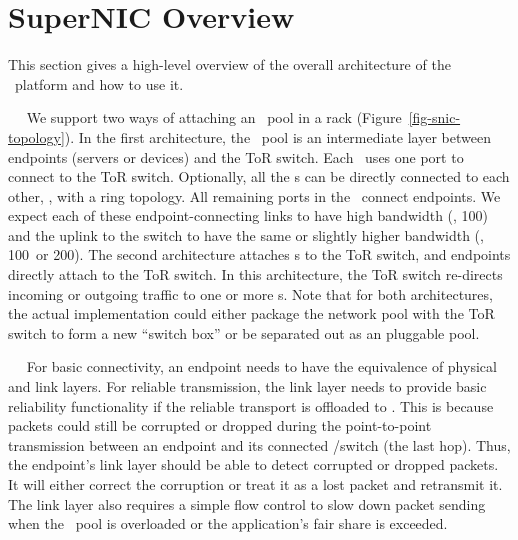 \section{SuperNIC Overview}
\label{sec:snic:overview}

This section gives a high-level overview of the overall architecture of the \snic\ platform and how to use it.

~~
We support two ways of attaching an \snic\ pool in a rack (Figure~\ref{fig-snic-topology}).
In the first architecture, the \snic\ pool is an intermediate layer between endpoints (servers or devices) and the ToR switch.
Each \snic\ uses one port to connect to the ToR switch.
Optionally, all the \snic{}s can be directly connected to each other, \eg, with a ring topology.
All remaining ports in the \snic\ connect endpoints.
We expect each of these endpoint-connecting links to have high bandwidth (\eg, 100\Gbps) and the uplink to the switch to have the same or slightly higher bandwidth (\eg, 100\Gbps\ or 200\Gbps). 
%
The second architecture attaches \snic{}s to the ToR switch, and endpoints directly attach to the ToR switch.
In this architecture, the ToR switch re-directs incoming or outgoing traffic to one or more \snic{}s. 
Note that for both architectures, the actual implementation could either package the network pool with the ToR switch to form a new ``switch box'' or be separated out as an pluggable pool. 


~~
For basic connectivity, an endpoint needs to have the equivalence of physical and link layers.
For reliable transmission, the link layer needs to provide basic reliability functionality if the reliable transport is offloaded to \snic.
This is because packets could still be corrupted or dropped during the point-to-point transmission between an endpoint and its connected \snic/switch (the last hop).
Thus, the endpoint's link layer should be able to detect corrupted or dropped packets. It will either correct the corruption or treat it as a lost packet and retransmit it.
The link layer also requires a simple flow control to slow down packet sending when the \snic\ pool is overloaded or the application's fair share is exceeded.

